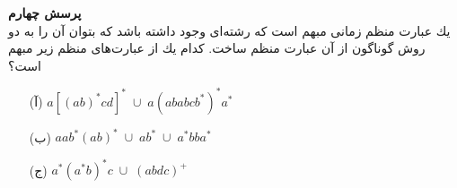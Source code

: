 \textbf{پرسش چهارم}\\[0.1in]
يك عبارت منظم زمانی مبهم است كه رشته‌ای وجود داشته باشد كه بتوان آن را به دو روش گوناگون از آن عبارت
منظم ساخت. كدام يك از عبارت‌های منظم زير مبهم است؟
\begin{itemize}
    \item[(آ)]
    $a[(ab)^*cd]^* \; \cup \; 
    a(ababcb^*)^*a^*$
    \item[(ب)]
    $aab^*(ab)^*\; \cup \;
    ab^* \; \cup \;
    a^*bba^*$
    \item[(ج)]
    $a^*(a^*b)^*c \; \cup \;
    (abdc)^+$
\end{itemize}